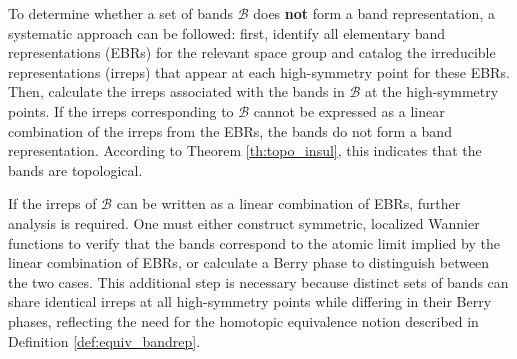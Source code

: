 To determine whether a set of bands \(\mathcal{B}\) does \textbf{not} form a band representation, a systematic approach can be followed: first, identify all elementary band representations (EBRs) for the relevant space group and catalog the irreducible representations (irreps) that appear at each high-symmetry point for these EBRs. Then, calculate the irreps associated with the bands in \(\mathcal{B}\) at the high-symmetry points. If the irreps corresponding to \(\mathcal{B}\) cannot be expressed as a linear combination of the irreps from the EBRs, the bands do not form a band representation. According to Theorem \ref{th:topo_insul}, this indicates that the bands are topological.

If the irreps of \(\mathcal{B}\) can be written as a linear combination of EBRs, further analysis is required. One must either construct symmetric, localized Wannier functions to verify that the bands correspond to the atomic limit implied by the linear combination of EBRs, or calculate a Berry phase to distinguish between the two cases. This additional step is necessary because distinct sets of bands can share identical irreps at all high-symmetry points while differing in their Berry phases, reflecting the need for the homotopic equivalence notion described in Definition \ref{def:equiv_bandrep}.




%



